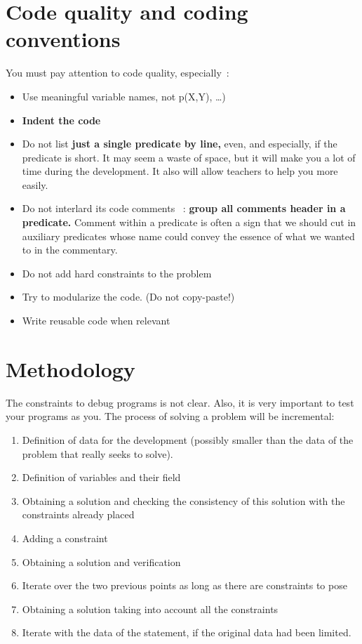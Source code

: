 \section*{Code quality and coding conventions}
You must pay attention to code quality, especially~:
\begin{itemize}
 \item Use meaningful variable names, not p(X,Y), \ldots)
 \item \textbf{Indent the code} 
 \item Do not list  \textbf{just a single predicate by line,} even, and especially, if the predicate is short. It may seem a waste of space, but it will make you a lot of time during the development. It also will allow teachers to help you more easily.
 \item Do not interlard its code comments
 ~: \textbf{group all
    comments header in a predicate.} Comment within a predicate is often a sign that we should cut in auxiliary predicates whose name could convey the essence of what we wanted to in the commentary.
 \item Do not add hard constraints to the problem
 \item Try to modularize the code. (Do not copy-paste!)
 \item Write reusable code when relevant
\end{itemize}


\section*{Methodology}
The constraints to debug programs is not clear. Also, it is very important to test your programs as you. The process of solving a problem will be incremental:
\begin{enumerate}
 \item Definition of data for the development (possibly smaller than the data of the problem that really seeks to solve).
 \item Definition of variables and their field
 \item Obtaining a solution and checking the consistency of this solution with the constraints already placed
 \item Adding a constraint
 \item Obtaining a solution and verification
 \item Iterate over the two previous points as long as there are constraints to pose
 \item \label{une:sol} Obtaining a solution taking into account all the constraints
\item Iterate with the data of the statement, if the original data had been limited.\\
\end{enumerate}

